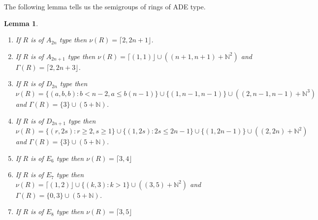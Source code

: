 \documentclass{article}
\newtheorem{lemma}[theorem]{Lemma}
\numberwithin{theorem}{section}
\begin{document}
The following lemma tells us the semigroups of rings of ADE type. 

\begin{lemma}\label{lem:ADE_nu_grp}
    \begin{enumerate}
        \item If $R$ is of $A_{2n}$ type then $\nu(R)= \lceil 2, 2n+1 \rfloor$.
        \item If $R$ is of $A_{2n+1}$ type then $\nu(R) = \lceil (1,1)\rfloor \cup ((n+1, n+1) + \mathbb{N}^2)$ and $\Gamma(R)=\lceil 2, 2n+3 \rfloor$. 
        \item If $R$ is of $D_{2n}$ type then $\nu(R) = \{(a,b,b) \colon b < n-2, a \leq b(n-1)\} \cup \{(1, n-1, n-1)\} \cup  ((2,n-1,n-1) + \mathbb{N}^3)$ and $\Gamma(R)=\{3\} \cup (5 + \mathbb{N})$.
        \item If $R$ is of $D_{2n+1}$ type then $\nu(R) = \{(r,2s) \colon r \geq 2, s \geq 1 \} \cup \{(1,2s) \colon 2s \leq 2n-1\} \cup \{(1, 2n-1)\} \cup ((2, 2n)+\mathbb{N}^2)$ and $\Gamma(R)=\{3\} \cup (5 + \mathbb{N})$.
        \item If $R$ is of $E_{6}$ type then $\nu(R) = \lceil 3,4 \rfloor$
        \item If $R$ is of $E_{7}$ type then $\nu(R) = \lceil (1,2) \rfloor \cup \{(k,3) \colon k >1\} \cup ((3,5) + \mathbb{N}^2)$ and $\Gamma(R) = \{0,3\} \cup (5+ \mathbb{N})$. 
        \item If $R$ is of $E_{8}$ type then $\nu(R) = \lceil 3,5 \rfloor$
    \end{enumerate}
\end{lemma}
\end{document}

